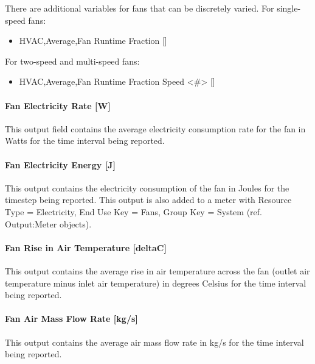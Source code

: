 There are additional variables for fans that can be discretely varied.
For single-speed fans:

\begin{itemize}
\item
  HVAC,Average,Fan Runtime Fraction {[]}
\end{itemize}

For two-speed and multi-speed fans:

\begin{itemize}
\item
  HVAC,Average,Fan Runtime Fraction Speed <\#> {[]}
\end{itemize}

\paragraph{Fan Electricity Rate {[}W{]}}\label{fan-electric-power-fansysmodel}

This output field contains the average electricity consumption rate for the fan in Watts for the time interval being reported.

\paragraph{Fan Electricity Energy {[}J{]}}\label{fan-electric-energy-fansysmodel}

This output contains the electricity consumption of the fan in Joules for the timestep being reported. This output is also added to a meter with Resource Type = Electricity, End Use Key = Fans, Group Key = System (ref. Output:Meter objects).

\paragraph{Fan Rise in Air Temperature {[}deltaC{]}}\label{fan-rise-in-air-temperature-deltac-fansysmodel}

This output contains the average rise in air temperature across the fan (outlet air temperature minus inlet air temperature) in degrees Celsius for the time interval being reported.

\paragraph{Fan Air Mass Flow Rate {[}kg/s{]}}\label{fan-air-mass-flow-fansysmodel}

This output contains the average air mass flow rate in kg/s for the time interval being reported.

